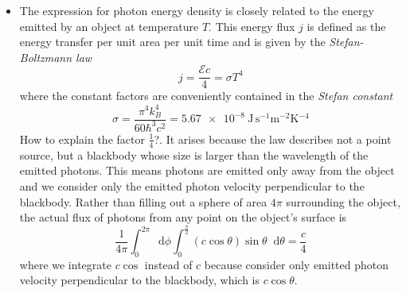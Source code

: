 \documentclass[11pt, a4paper]{article}
\newcommand{\diff}{\mathop{}\!\mathrm{d}} %
\begin{document}
\begin{itemize}
	\item The expression for photon energy density is closely related to the energy emitted by an object at temperature $ T $. This energy flux $ j $ is defined as the energy transfer per unit area per unit time and is given by the \textit{Stefan-Boltzmann law}
	\begin{equation*}
		j = \frac{\mathcal{E}c}{4} = \sigma T^{4}
	\end{equation*}
	where the constant factors are conveniently contained in the \textit{Stefan constant} 
	\begin{equation*}
		\sigma = \frac{\pi^{4}k_{B}^{4}}{60\hbar^{3}c^{2}} = \SI{5.67e-8}{\joule\, \second^{-1}\meter^{-2}\kelvin^{-4}}
	\end{equation*}
	How to explain the factor $ \frac{1}{4} $?. It arises because the law describes not a point source, but a blackbody whose size is larger than the wavelength of the emitted photons. This means photons are emitted only away from the object and we consider only the emitted photon velocity perpendicular to the blackbody. Rather than filling out a sphere of area $ 4\pi $ surrounding the object, the actual flux of photons from any point on the object's surface is
	\begin{equation*}
		\frac{1}{4\pi} \int_{0}^{2\pi}\diff \phi \int_{0}^{\frac{\pi}{2}} (c \cos \theta)\sin \theta \diff \theta = \frac{c}{4}
	\end{equation*}
	where we integrate $ c \cos  $ instead of $ c $ because consider only emitted photon velocity perpendicular to the blackbody, which is $ c \cos \theta $.
	
\end{itemize}
\end{document}
